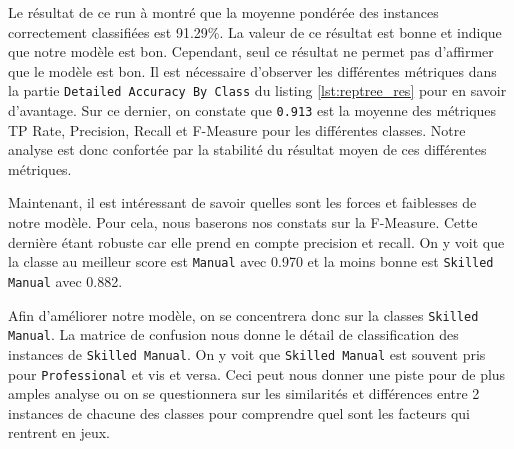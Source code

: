 Le résultat de ce run à montré que la moyenne pondérée des instances correctement classifiées est 91.29\%. La valeur de ce résultat est bonne et indique que notre modèle est bon. Cependant, seul ce résultat ne permet pas d'affirmer que le modèle est bon. Il est nécessaire d'observer les différentes métriques dans la partie \texttt{Detailed Accuracy By Class} du listing \autoref{lst:reptree_res} pour en savoir d'avantage. Sur ce dernier, on constate que \texttt{0.913} est la moyenne des métriques TP Rate, Precision, Recall et F-Measure pour les différentes classes. Notre analyse est donc confortée par la stabilité du résultat moyen de ces différentes métriques. 

Maintenant, il est intéressant de savoir quelles sont les forces et faiblesses de notre modèle. Pour cela, nous baserons nos constats sur la F-Measure. Cette dernière étant robuste car elle prend en compte precision et recall. On y voit que la classe au meilleur score est \texttt{Manual} avec 0.970 et la moins bonne est \texttt{Skilled Manual} avec 0.882.

Afin d'améliorer notre modèle, on se concentrera donc sur la classes \texttt{Skilled Manual}. La matrice de confusion nous donne le détail de classification des instances de \texttt{Skilled Manual}. On y voit que \texttt{Skilled Manual} est souvent pris pour \texttt{Professional} et vis et versa. Ceci peut nous donner une piste pour de plus amples analyse ou on se questionnera sur les similarités et différences entre 2 instances de chacune des classes pour comprendre quel sont les facteurs qui rentrent en jeux.

